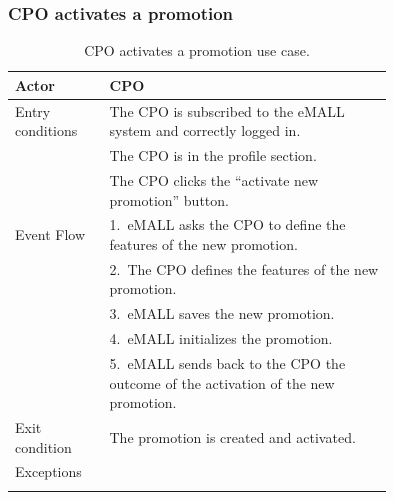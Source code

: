 \subsubsection*{CPO activates a promotion}
\begin{center}
    \begin{longtable}{lp{0.75\linewidth}}
        \hline
        Actor            & CPO                                                                                 \\
        \hline
        Entry conditions & The CPO is subscribed to the eMALL system and correctly logged in.                  \\
        & The CPO is in the profile section.                                                  \\
        & The CPO clicks the “activate new promotion” button.                                 \\
        \hline
        Event Flow       & 1.\ eMALL asks the CPO to define the features of the new promotion.                 \\
        & 2.\ The CPO defines the features of the new promotion.                              \\
        & 3.\ eMALL saves the new promotion.                                                  \\
        & 4.\ eMALL initializes the promotion.                                                \\
        & 5.\ eMALL sends back to the CPO the outcome of the activation of the new promotion. \\
        \hline
        Exit condition   & The promotion is created and activated.                                             \\
        \hline
        Exceptions       &                                                                                     \\
        \hline
        \caption{CPO activates a promotion use case.}
        \label{tab: CPO_activates_promotion_use_case}
    \end{longtable}
\end{center}

